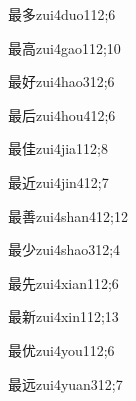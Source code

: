 \begin{verbete}{最多}{zui4duo1}{12;6}
\end{verbete}

\begin{verbete}{最高}{zui4gao1}{12;10}
\end{verbete}

\begin{verbete}{最好}{zui4hao3}{12;6}
\end{verbete}

\begin{verbete}{最后}{zui4hou4}{12;6}
\end{verbete}

\begin{verbete}{最佳}{zui4jia1}{12;8}
\end{verbete}

\begin{verbete}{最近}{zui4jin4}{12;7}
\end{verbete}

\begin{verbete}{最善}{zui4shan4}{12;12}
\end{verbete}

\begin{verbete}{最少}{zui4shao3}{12;4}
\end{verbete}

\begin{verbete}{最先}{zui4xian1}{12;6}
\end{verbete}

\begin{verbete}{最新}{zui4xin1}{12;13}
\end{verbete}

\begin{verbete}{最优}{zui4you1}{12;6}
\end{verbete}

\begin{verbete}{最远}{zui4yuan3}{12;7}
\end{verbete}

